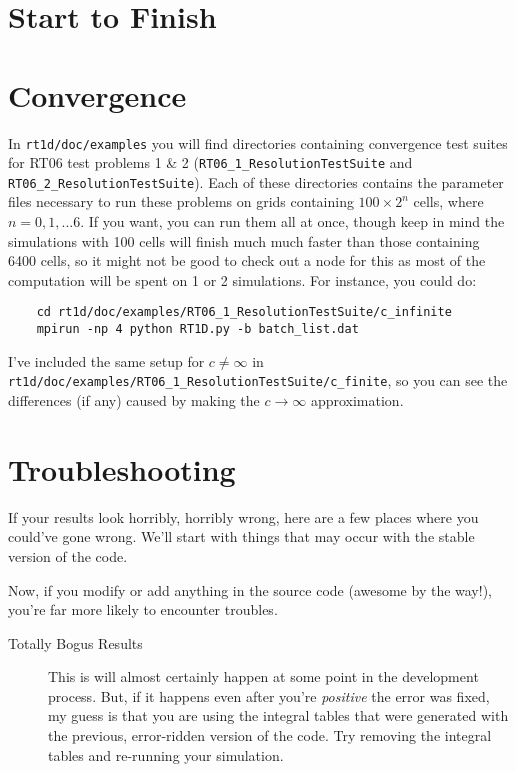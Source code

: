 \documentclass[letterpaper,titlepage,12pt]{article}
\numberwithin{equation}{section}
\begin{document}
\section{Start to Finish}

\section{Convergence}
In \texttt{rt1d/doc/examples} you will find directories containing convergence test suites for RT06 test problems 1 \& 2 (\texttt{RT06\_1\_ResolutionTestSuite} and \texttt{RT06\_2\_ResolutionTestSuite}).  Each of these directories contains the parameter files necessary to run these problems on grids containing $100 \times 2^n$ cells, where $n = 0,1,...6$.  If you want, you can run them all at once, though keep in mind the simulations with 100 cells will finish much much faster than those containing 6400 cells, so it might not be good to check out a node for this as most of the computation will be spent on 1 or 2 simulations.  For instance, you could do:
\begin{verbatim}
    cd rt1d/doc/examples/RT06_1_ResolutionTestSuite/c_infinite
    mpirun -np 4 python RT1D.py -b batch_list.dat
\end{verbatim}
I've included the same setup for $c \neq \infty$ in \texttt{rt1d/doc/examples/RT06\_1\_ResolutionTestSuite/c\_finite}, so you can see the differences (if any) caused by making the $c \rightarrow \infty$ approximation.

\section{Troubleshooting}
If your results look horribly, horribly wrong, here are a few places where you could've gone wrong.  We'll start with things that may occur with the stable version of the code.


Now, if you modify or add anything in the source code (awesome by the way!), you're far more likely to encounter troubles.


\begin{description}
    \item[Totally Bogus Results] This is will almost certainly happen at some point in the development process. But, if it happens even after you're \textit{positive} the error was fixed, my guess is that you are using the integral tables that were generated with the previous, error-ridden version of the code.  Try removing the integral tables and re-running your simulation.
\end{description}
\end{document}
